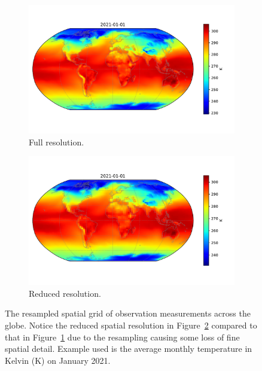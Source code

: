  \begin{figure}[htbp!] 
 	\centering    
	\begin{subfigure}[b]{0.45\textwidth}
		\includegraphics[width=\textwidth]{full_grid}
		\caption{Full resolution.}
		\label{fig:full_res}   
	\end{subfigure}             
	\begin{subfigure}[b]{0.45\textwidth}
		\includegraphics[width=\textwidth]{coarse_grid}
		\caption{Reduced resolution.}
		\label{fig:coarse_res}
	\end{subfigure}             
 	\caption[CESM-LE resampled spatial grid after preprocessing]{The resampled spatial grid of observation measurements across the globe. Notice the reduced spatial resolution in Figure~\ref{fig:coarse_res} compared to that in Figure~\ref{fig:full_res} due to the resampling causing some loss of fine spatial detail. Example used is the average monthly temperature in Kelvin ($\si{\kelvin}$) on January 2021.}
 	\label{fig:cesm_grid}
 \end{figure}

